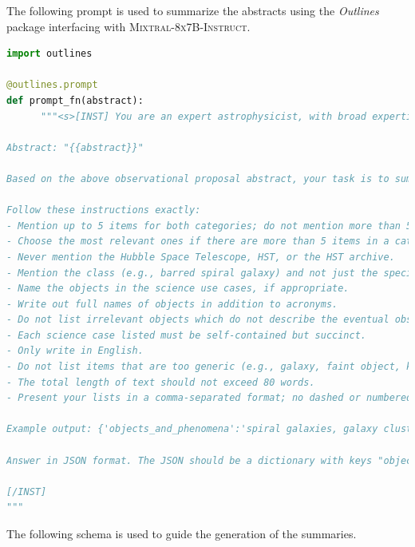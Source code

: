\documentclass[10pt]{article} %
\newcommand{\package}[1]{\textsl{#1}\xspace}
\begin{document}
The following prompt is used to summarize the abstracts using the \package{Outlines} package interfacing with \textsc{Mixtral-8x7B-Instruct}.

\begin{lstlisting}[language=Python]
import outlines 

@outlines.prompt
def prompt_fn(abstract):
      """<s>[INST] You are an expert astrophysicist, with broad expertise across observational and theoretical astrophysics. You are able to extract core information from astrophysical texts.

Abstract: "{{abstract}}"

Based on the above observational proposal abstract, your task is to summarize the nature of the eventual observations. You will identify the astrophysical objects and phenomena, as well as the potential science use cases described in the abstract.

Follow these instructions exactly:
- Mention up to 5 items for both categories; do not mention more than 5 items in either category. 
- Choose the most relevant ones if there are more than 5 items in a category.
- Never mention the Hubble Space Telescope, HST, or the HST archive.
- Mention the class (e.g., barred spiral galaxy) and not just the specific instance (e.g., Andromeda).
- Name the objects in the science use cases, if appropriate.
- Write out full names of objects in addition to acronyms.
- Do not list irrelevant objects which do not describe the eventual observation, such as units or proposal Cycle numbers. List fewer but more relevant objects, if in doubt.
- Each science case listed must be self-contained but succinct.
- Only write in English.
- Do not list items that are too generic (e.g., galaxy, faint object, kinematics)
- The total length of text should not exceed 80 words.
- Present your lists in a comma-separated format; no dashed or numbered lists.

Example output: {'objects_and_phenomena':'spiral galaxies, galaxy clusters, supernova remnants', 'science_use_cases':'model galactic structure and evolution, characterize dark matter distribution in clusters, analyze expansion rates of supernova remnants'}

Answer in JSON format. The JSON should be a dictionary with keys "objects_and_phenomena" and "science_use_cases".

[/INST]
"""
\end{lstlisting}

The following schema is used to guide the generation of the summaries.
\end{document}
